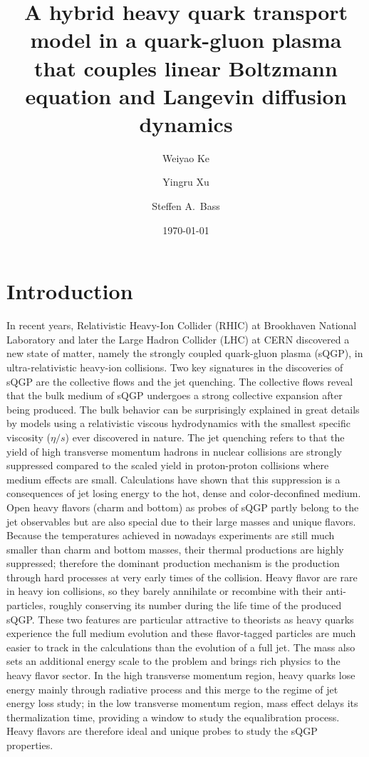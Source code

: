\documentclass[aps, prc, reprint, amsmath, groupedaddress, nofootinbib]{revtex4-1}
\begin{document}
\title{A hybrid heavy quark transport model in a quark-gluon plasma that couples linear Boltzmann equation and Langevin diffusion dynamics}
\author{Weiyao Ke}
\author{Yingru Xu}
\author{Steffen A.\ Bass}
\date{\today}
\maketitle

\section{Introduction}
In recent years, Relativistic Heavy-Ion Collider (RHIC) at Brookhaven National Laboratory and later the Large Hadron Collider (LHC) at CERN discovered a new state of matter, namely the strongly coupled quark-gluon plasma (sQGP), in ultra-relativistic heavy-ion collisions.
Two key signatures in the discoveries of sQGP are the collective flows and the jet quenching.
The collective flows reveal that the bulk medium of sQGP undergoes a strong collective expansion after being produced.
The bulk behavior can be surprisingly explained in great details by models using a relativistic viscous hydrodynamics with the smallest specific viscosity ($\eta/s$) ever discovered in nature.
The jet quenching refers to that the yield of high transverse momentum hadrons in nuclear collisions are strongly suppressed compared to the scaled yield in proton-proton collisions where medium effects are small.
Calculations have shown that this suppression is a consequences of jet losing energy to the hot, dense and color-deconfined medium. 
Open heavy flavors (charm and bottom) as probes of sQGP partly belong to the jet observables but are also special due to their large masses and unique flavors.
Because the temperatures achieved in nowadays experiments are still much smaller than charm and bottom masses, their thermal productions are highly suppressed; 
therefore the dominant production mechanism is the production through hard processes at very early times of the collision.
Heavy flavor are rare in heavy ion collisions, so they barely annihilate or recombine with their anti-particles, roughly conserving its number during the life time of the produced sQGP.
These two features are particular attractive to theorists as heavy quarks experience the full medium evolution and these flavor-tagged particles are much easier to track in the calculations than the evolution of a full jet.
The mass also sets an additional energy scale to the problem and brings rich physics to the heavy flavor sector.
In the high transverse momentum region, heavy quarks lose energy mainly through radiative process and this merge to the regime of jet energy loss study;
in the low transverse momentum region, mass effect delays its thermalization time, providing a window to study the equalibration process.
Heavy flavors are therefore ideal and unique probes to study the sQGP properties.
\end{document}
